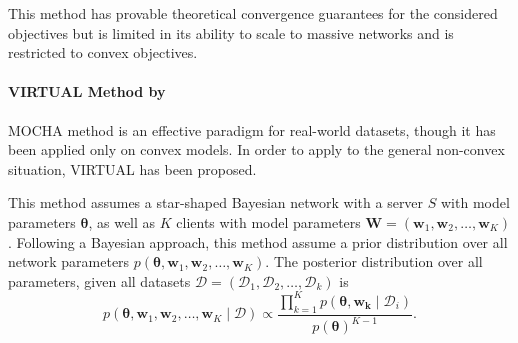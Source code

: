 \documentclass[a4paper,12pt,authoryear]{elegantpaper}
\begin{document}
This method has provable theoretical convergence guarantees for the considered objectives but is limited in its ability to scale to massive networks and is restricted to convex objectives.

\paragraph{VIRTUAL Method by \cite{corinzia_variational_2021}}

MOCHA method is an effective paradigm for real-world datasets, though it has been applied only on convex models. In order to apply to the general non-convex situation, VIRTUAL has been proposed.

This method assumes a star-shaped Bayesian network with a server $S$ with model parameters $\mathbf{\theta}$, as well as $K$ clients with model parameters $\mathbf{W}=(\mathbf{w}_{1},\mathbf{w}_{2},\ldots,\mathbf{w}_{K})$. Following a Bayesian approach, this method assume a prior distribution over all network parameters $p\left(\mathbf{\theta},\mathbf{w}_{1},\mathbf{w}_{2},\ldots,\mathbf{w}_{K}\right)$. The posterior distribution over all parameters, given all datasets $\mathcal{D}=\left(\mathcal{D}_{1},\mathcal{D}_{2},\ldots,\mathcal{D}_{k}\right)$ is
\begin{equation}
    p\left(\mathbf{\theta},\mathbf{w}_{1},\mathbf{w}_{2},\ldots,\mathbf{w}_{K}\mid\mathcal{D}\right)\propto\frac{\prod_{k=1}^{K}p\left(\mathbf{\theta},\mathbf{w}_{\mathbf{k}} \mid \mathcal{D}_{i}\right)}{p(\mathbf{\theta})^{K-1}}.
\end{equation}
\end{document}
